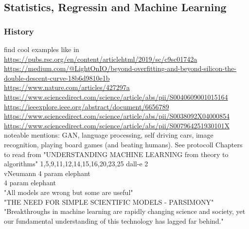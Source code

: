 

\subsection{Statistics, Regressin and Machine Learning}
\subsubsection{History}
find cool examples like in \url{https://pubs.rsc.org/en/content/articlehtml/2019/sc/c9sc01742a}  \\
\url{https://medium.com/@LightOnIO/beyond-overfitting-and-beyond-silicon-the-double-descent-curve-18b6d9810e1b}  \\
\url{https://www.nature.com/articles/427297a}\\
\url{https://www.sciencedirect.com/science/article/abs/pii/S0040609001015164} \\
\url{https://ieeexplore.ieee.org/abstract/document/6656789}\\
\url{https://www.sciencedirect.com/science/article/abs/pii/S0038092X04000854}\\
\url{https://www.sciencedirect.com/science/article/abs/pii/S007964251930101X}\\

noteable mentions: GAN, language processing, self driving cars, image recognition, playing board games (and beating humans). 
See protocoll
Chapters to read from "UNDERSTANDING MACHINE LEARNING from theory to algorithms" 1,5,9,11,12,14,15,16,20,23,25
dall-e 2 \cite{Marcus2022}\\
vNeumann 4 param elephant \cite{Dyson2004}\\
4 param elephant \cite{Mayer2010}\\
"All models are wrong but some are useful" \cite{Box1979}\\
"THE NEED FOR SIMPLE SCIENTIFIC MODELS - PARSIMONY" \cite{Box1979}\\
"Breakthroughs in machine learning are rapidly changing science and society, yet our fundamental understanding of this technology has lagged far behind." \cite{Belkin2018}\\
